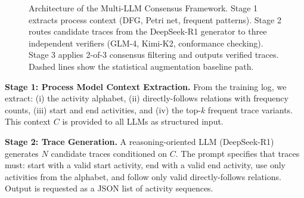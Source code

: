 \documentclass[11pt,a4paper]{article}
\begin{document}
\begin{figure}[t]
\caption{Architecture of the Multi-LLM Consensus Framework. Stage 1 extracts process context (DFG, Petri net, frequent patterns). Stage 2 routes candidate traces from the DeepSeek-R1 generator to three independent verifiers (GLM-4, Kimi-K2, conformance checking). Stage 3 applies 2-of-3 consensus filtering and outputs verified traces. Dashed lines show the statistical augmentation baseline path.}
\label{fig:architecture}
\end{figure}

\textbf{Stage 1: Process Model Context Extraction.} From the training log, we extract: (i) the activity alphabet, (ii) directly-follows relations with frequency counts, (iii) start and end activities, and (iv) the top-$k$ frequent trace variants. This context $C$ is provided to all LLMs as structured input.

\textbf{Stage 2: Trace Generation.} A reasoning-oriented LLM (DeepSeek-R1) generates $N$ candidate traces conditioned on $C$. The prompt specifies that traces must: start with a valid start activity, end with a valid end activity, use only activities from the alphabet, and follow only valid directly-follows relations. Output is requested as a JSON list of activity sequences.
\end{document}

